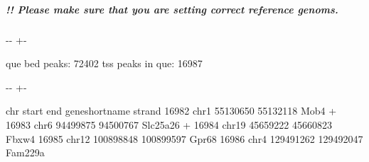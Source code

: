 \documentclass[letterpaper,10pt,english]{sphinxmanual}
\newlength\nbsphinxcodecellspacing
\begin{document}
\subparagraph{!! Please make sure that you are setting correct reference genoms.}
\label{\detokenize{notebooks/01_ATAC-seq_data_processing/option1_scATAC-seq_data_analysis_with_cicero/02_preprocess_peak_data:!!-Please-make-sure-that-you-are-setting-correct-reference-genoms.}}
{
%
\begin{sphinxVerbatim}[commandchars=\\\{\}]
\llap{\color{nbsphinxin}[5]:\,\hspace{\fboxrule}\hspace{\fboxsep}}   

\end{sphinxVerbatim}
}



%
{
\kern-\sphinxverbatimsmallskipamount\kern-\baselineskip
\kern+\FrameHeightAdjust\kern-\fboxrule
\vspace{\nbsphinxcodecellspacing}
%
\begin{sphinxVerbatim}[commandchars=\\\{\}]
que bed peaks: 72402
tss peaks in que: 16987
\end{sphinxVerbatim}
}
\relax

{

\kern-\sphinxverbatimsmallskipamount\kern-\baselineskip
\kern+\FrameHeightAdjust\kern-\fboxrule
\vspace{\nbsphinxcodecellspacing}

%
\begin{sphinxVerbatim}[commandchars=\\\{\}]
\llap{\color{nbsphinxout}[5]:\,\hspace{\fboxrule}\hspace{\fboxsep}}         chr      start        end gene\PYGZus{}short\PYGZus{}name strand
16982   chr1   55130650   55132118            Mob4      +
16983   chr6   94499875   94500767        Slc25a26      +
16984  chr19   45659222   45660823           Fbxw4      \PYGZhy{}
16985  chr12  100898848  100899597           Gpr68      \PYGZhy{}
16986   chr4  129491262  129492047         Fam229a      \PYGZhy{}
\end{sphinxVerbatim}
}
\end{document}
